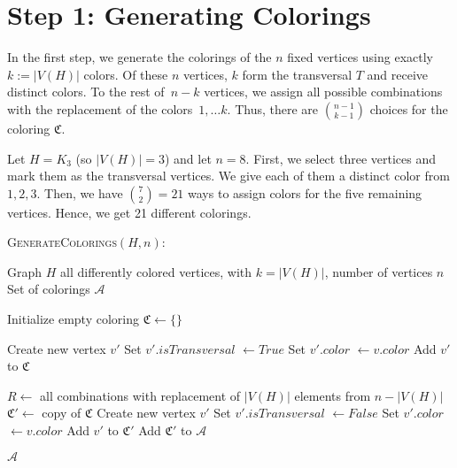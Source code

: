 \section{Step 1: Generating Colorings}
In the first step, we generate the colorings of the $n$ fixed vertices using exactly $k := |V(H)|$ colors.
Of these $n$ vertices, $k$ form the transversal $T$ and receive distinct colors. To the rest of~$n - k$ vertices, 
we assign all possible combinations with the replacement of the colors~$1, \dots k$. 
Thus, there are $\binom{n - 1}{k - 1}$ choices for the coloring $\mathfrak{C}$.
\begin{example}
 Let \(H = K_3\) (so \( |V(H)| = 3 \)) and let \(n = 8\). 
 First, we select three vertices and mark them as the transversal vertices.
 We give each of them a distinct color from $1, 2, 3$.
 Then, we have $\binom{7}{2} = 21$ ways to assign colors for the five remaining vertices. 
 Hence, we get 21 different colorings.
\end{example}


\begin{algorithm}[H]
    \caption{\textsc{GenerateColorings}$(H, n)$:}
    \label{alg:balanced-coloring}
    \begin{algorithmic}[1]
    \Require Graph $H$ all differently colored vertices, with $k = |V(H)|$, number of vertices $n$
    \Ensure Set of colorings $\mathcal{A}$

    \State Initialize empty coloring $\mathfrak{C} \gets \{\}$
    
        \State Create new vertex $v'$
        \State Set $v'.isTransversal$ $\gets True$
        \State Set $v'.color$  $\gets v.color$
        \State Add $v'$ to $\mathfrak{C}$
    \EndFor
    

        \State $R \gets$ all combinations with replacement of $|V(H)|$ elements from $n - |V(H)|$
            \State $\mathfrak{C}' \gets$ copy of $\mathfrak{C}$
                \State Create new vertex $v'$
                \State Set $v'.isTransversal$ $\gets False$
                \State Set $v'.color$  $\gets v.color$
                \State Add $v'$ to $\mathfrak{C}'$
            \EndFor
            \State Add $\mathfrak{C}'$ to $\mathcal{A}$
        \EndFor
    
    \State \Return $\mathcal{A}$
    \end{algorithmic}
\end{algorithm}

